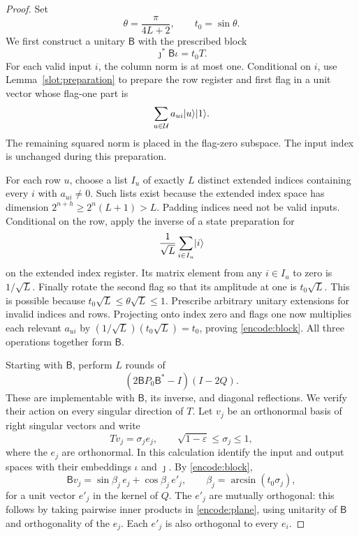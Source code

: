 \begin{proof}
Set
\begin{equation}\label{encode:angle}
 \theta=\frac\pi{4L+2},\qquad t_0=\sin\theta.
\end{equation}
We first construct a unitary $\mathsf B$ with the prescribed block
\begin{equation}\label{encode:block}
 \jmath^*\mathsf B\iota=t_0T.
\end{equation}
For each valid input $i$, the column norm is at most one. Conditional on
$i$, use Lemma~\ref{slot:preparation} to prepare the row register and
first flag in a unit vector whose flag-one part is
\[
 \sum_{u\in\mathcal U}a_{ui}\lvert u\rangle\lvert 1\rangle.
\]
The remaining squared norm is placed in the flag-zero subspace. The
input index is unchanged during this preparation.

For each row $u$, choose a list $I_u$ of exactly $L$ distinct extended
indices containing every $i$ with $a_{ui}\ne0$. Such lists exist because
the extended index space has dimension
$2^{n+h}\ge2^n(L+1)>L$. Padding indices need not be valid inputs.
Conditional on the row, apply the inverse of a state preparation for
\[
 \frac1{\sqrt L}\sum_{i\in I_u}\lvert i\rangle
\]
on the extended index register. Its matrix element from any $i\in I_u$
to zero is $1/\sqrt L$. Finally rotate the second flag so that its
amplitude at one is $t_0\sqrt L$. This is possible because
$t_0\sqrt L\le\theta\sqrt L\le1$. Prescribe arbitrary unitary extensions
for invalid indices and rows. Projecting onto index zero and flags one
now multiplies each relevant $a_{ui}$ by
$(1/\sqrt L)(t_0\sqrt L)=t_0$, proving \eqref{encode:block}.
All three operations together form $\mathsf B$.

Starting with $\mathsf B$, perform $L$ rounds of
\begin{equation}\label{encode:round}
 (2\mathsf B P_0\mathsf B^*-I)(I-2Q).
\end{equation}
These are implementable with $\mathsf B$, its inverse, and diagonal
reflections. We verify their action on every singular direction of $T$.
Let $v_j$ be an orthonormal basis of right singular vectors and write
\[
 Tv_j=\sigma_j e_j,\qquad
 \sqrt{1-\varepsilon}\le\sigma_j\le1,
\]
where the $e_j$ are orthonormal. In this calculation identify the input
and output spaces with their embeddings $\iota$ and $\jmath$.
By \eqref{encode:block},
\begin{equation}\label{encode:plane}
 \mathsf Bv_j=\sin\beta_j\,e_j+\cos\beta_j\,e'_j,
 \qquad \beta_j=\arcsin(t_0\sigma_j),
\end{equation}
for a unit vector $e'_j$ in the kernel of $Q$. The $e'_j$ are mutually
orthogonal: this follows by taking pairwise inner products in
\eqref{encode:plane}, using unitarity of $\mathsf B$ and orthogonality of
the $e_j$. Each $e'_j$ is also orthogonal to every $e_i$.


\end{proof}
